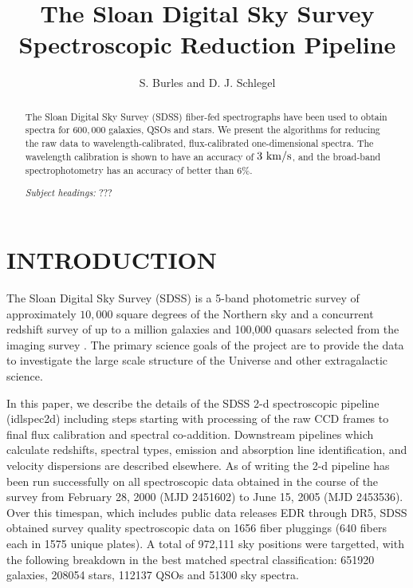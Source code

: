 \documentclass[12pt,preprint]{aastex}
\newcommand{\kms}{{\rm ~km/s}}
\begin{document}
\title{The Sloan Digital Sky Survey Spectroscopic Reduction Pipeline}

\author{
S. Burles\altaffilmark{\ref{MIT}}
and D. J. Schlegel\altaffilmark{\ref{Princeton}}
}


\begin{abstract}
The Sloan Digital Sky Survey (SDSS) fiber-fed spectrographs have been used
to obtain spectra for $600,000$ galaxies, QSOs and stars.
We present the algorithms for reducing the raw data to
wavelength-calibrated, flux-calibrated one-dimensional spectra.
The wavelength calibration is shown to have an accuracy of $3 \kms$,
and the broad-band spectrophotometry has an accuracy of better than $6\%$.

\emph{Subject headings: }
???
\end{abstract}

\section{INTRODUCTION}
\label{sec_intro}
The Sloan Digital Sky Survey (SDSS) is a 5-band photometric survey of
approximately $10,000$ square degrees of the Northern sky and a concurrent
redshift survey of up to a million galaxies and 100,000 quasars
selected from the imaging survey \cite{york00}.  The primary 
science goals of the project are to provide the data to investigate the
large scale structure of the Universe and other extragalactic science.

In this paper, we describe the details of the SDSS 2-d spectroscopic pipeline
(idlspec2d) including steps starting with processing of the raw CCD frames to final
flux calibration and spectral co-addition.  Downstream pipelines which
calculate redshifts, spectral types, emission and absorption line identification,
and velocity dispersions are described elsewhere.
As of writing the 2-d pipeline has been run successfully on all spectroscopic
data obtained in the course of the survey from February 28, 2000 (MJD 2451602) 
to June 15, 2005 (MJD 2453536).  Over this timespan, which includes public data 
releases EDR through DR5, SDSS obtained survey quality spectroscopic data on
1656 fiber pluggings (640 fibers each in 1575 unique plates).   
A total of 972,111 sky positions were targetted, with the following 
breakdown in the best matched spectral classification:  651920 galaxies, 
208054 stars, 112137 QSOs and 51300 sky spectra.
\end{document}
